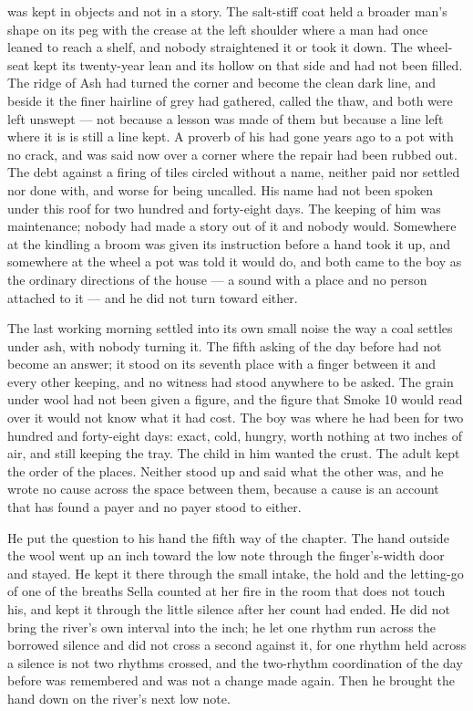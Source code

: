  was kept in objects and not in a story. The salt-stiff coat held a broader man's shape on its peg with the crease at the left shoulder where a man had once leaned to reach a shelf, and nobody straightened it or took it down. The wheel-seat kept its twenty-year lean and its hollow on that side and had not been filled. The ridge of Ash had turned the corner and become the clean dark line, and beside it the finer hairline of grey had gathered, called the thaw, and both were left unswept — not because a lesson was made of them but because a line left where it is is still a line kept. A proverb of his had gone years ago to a pot with no crack, and was said now over a corner where the repair had been rubbed out. The debt against a firing of tiles circled without a name, neither paid nor settled nor done with, and worse for being uncalled. His name had not been spoken under this roof for two hundred and forty-eight days. The keeping of him was maintenance; nobody had made a story out of it and nobody would. Somewhere at the kindling a broom was given its instruction before a hand took it up, and somewhere at the wheel a pot was told it would do, and both came to the boy as the ordinary directions of the house — a sound with a place and no person attached to it — and he did not turn toward either.

The last working morning settled into its own small noise the way a coal settles under ash, with nobody turning it. The fifth asking of the day before had not become an answer; it stood on its seventh place with a finger between it and every other keeping, and no witness had stood anywhere to be asked. The grain under wool had not been given a figure, and the figure that Smoke 10 would read over it would not know what it had cost. The boy was where he had been for two hundred and forty-eight days: exact, cold, hungry, worth nothing at two inches of air, and still keeping the tray. The child in him wanted the crust. The adult kept the order of the places. Neither stood up and said what the other was, and he wrote no cause across the space between them, because a cause is an account that has found a payer and no payer stood to either.

He put the question to his hand the fifth way of the chapter. The hand outside the wool went up an inch toward the low note through the finger's-width door and stayed. He kept it there through the small intake, the hold and the letting-go of one of the breaths Sella counted at her fire in the room that does not touch his, and kept it through the little silence after her count had ended. He did not bring the river's own interval into the inch; he let one rhythm run across the borrowed silence and did not cross a second against it, for one rhythm held across a silence is not two rhythms crossed, and the two-rhythm coordination of the day before was remembered and was not a change made again. Then he brought the hand down on the river's next low note.

